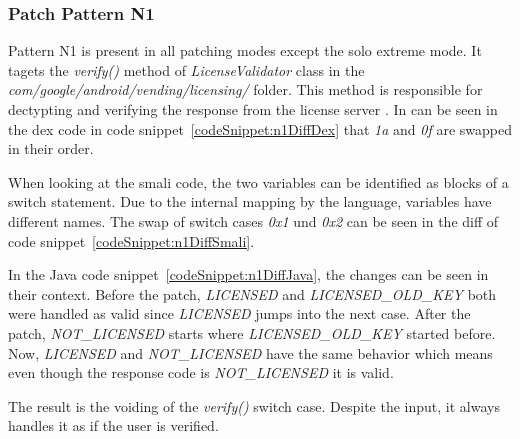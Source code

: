 \subsubsection{Patch Pattern N1}
Pattern N1 is present in all patching modes except the solo extreme mode.
It tagets the \textit{verify()} method of \textit{LicenseValidator} class in the \textit{com/google/android/vending/licensing/} folder.
This method is responsible for dectypting and verifying the response from the license server \cite{developersLicensingReference}.
\newline
In can be seen in the dex code in code snippet~\ref{codeSnippet:n1DiffDex} that \textit{1a} and \textit{0f} are swapped in their order.
\newline

When looking at the smali code, the two variables can be identified as blocks of a switch statement.
Due to the internal mapping by the language, variables have different names.
The swap of switch cases \textit{0x1} und \textit{0x2} can be seen in the diff of code snippet~\ref{codeSnippet:n1DiffSmali}.
\newline

In the Java code snippet~\ref{codeSnippet:n1DiffJava}, the changes can be seen in their context.
Before the patch, \textit{LICENSED} and \textit{LICENSED\_OLD\_KEY} both were handled as valid since \textit{LICENSED} jumps into the next case.
After the patch, \textit{NOT\_LICENSED} starts where \textit{LICENSED\_OLD\_KEY} started before.
Now, \textit{LICENSED} and \textit{NOT\_LICENSED} have the same behavior which means even though the response code is \textit{NOT\_LICENSED} it is valid.
\newline

The result is the voiding of the \textit{verify()} switch case.
Despite the input, it always handles it as if the user is verified.

